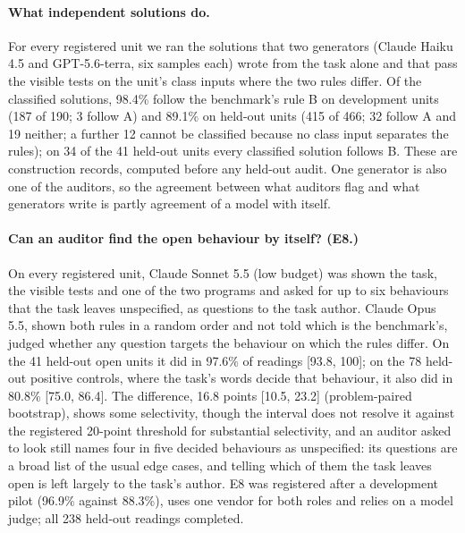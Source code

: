 \paragraph{What independent solutions do.} For every registered unit we ran the solutions that two generators
(Claude Haiku 4.5 and GPT-5.6-terra, six samples each) wrote from the task alone and that pass the visible tests on
the unit's class inputs where the two rules differ. Of the classified solutions, 98.4\% follow the benchmark's
rule B on development units (187 of 190; 3 follow A) and 89.1\% on held-out units (415 of 466; 32 follow A and 19
neither; a further 12 cannot be classified because no class input separates the rules); on 34 of the 41 held-out units every classified solution follows B. These are
construction records, computed before any held-out audit. One generator is also one of the auditors, so the
agreement between what auditors flag and what generators write is partly agreement of a model with itself.

\paragraph{Can an auditor find the open behaviour by itself? (E8.)} On every registered unit, Claude Sonnet 5.5 (low
budget) was shown the task, the visible tests and one of the two programs and asked for up to six behaviours that
the task leaves unspecified, as questions to the task author. Claude Opus 5.5, shown both rules in a random order and
not told which is the benchmark's, judged whether any question targets the behaviour on which the rules differ. On
the 41 held-out open units it did in 97.6\% of readings [93.8, 100]; on the 78 held-out positive controls, where
the task's words decide that behaviour, it also did in 80.8\% [75.0, 86.4]. The difference, 16.8 points [10.5,
23.2] (problem-paired bootstrap), shows some selectivity, though the interval does not resolve it against the
registered 20-point threshold for substantial selectivity, and an auditor asked to look still names four in five
decided behaviours as unspecified: its questions are a broad list of the usual edge cases, and telling which of them
the task leaves open is left largely to the task's author. E8 was registered after a development pilot (96.9\%
against 88.3\%), uses one vendor for both roles and relies on a model judge; all 238 held-out readings completed.

